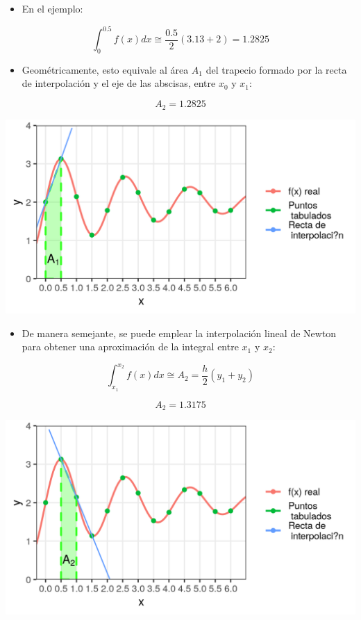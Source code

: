 \documentclass[openany]{book}
\providecommand{\tightlist}{%
  \setlength{\itemsep}{0pt}\setlength{\parskip}{0pt}}
\begin{document}
\begin{itemize}
\tightlist
\item
  En el ejemplo:
\end{itemize}

\[
\int_{0}^{0.5} f(x)dx \cong  \frac{0.5}{2} (3.13 + 2) = 1.2825
\]

\begin{itemize}
\tightlist
\item
  Geométricamente, esto equivale al área \(A_1\) del trapecio formado por la recta de interpolación y el eje de las abscisas, entre \(x_0\) y \(x_1\):
\end{itemize}

\[A_2=1.2825\]

\begin{center}\includegraphics[width=1\linewidth]{Plots/U4/Unidad4_2_g2} \end{center}

\begin{itemize}
\tightlist
\item
  De manera semejante, se puede emplear la interpolación lineal de Newton para obtener una aproximación de la integral entre \(x_1\) y \(x_2\):
\end{itemize}

\[
\int_{x_1}^{x_2} f(x)dx \cong A_2 = \frac{h}{2} (y_1 + y_2)
\]

\[A_2=1.3175\]

\begin{center}\includegraphics[width=1\linewidth]{Plots/U4/Unidad4_2_g3} \end{center}
\end{document}
